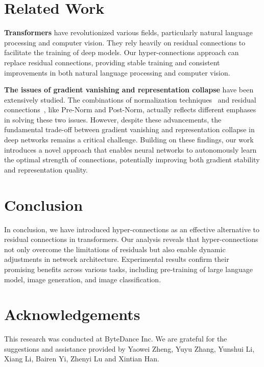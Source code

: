 \documentclass{article} %
\begin{document}
\section{Related Work}

\textbf{Transformers} \citep{vaswani2017attention} have revolutionized various fields, particularly natural language processing and computer vision. They rely heavily on residual connections to facilitate the training of deep models. Our hyper-connections approach can replace residual connections, providing stable training and consistent improvements in both natural language processing and computer vision.

\textbf{The issues of gradient vanishing and representation collapse} \citep{bengio1994learning,glorot2010understanding,liu2020understanding} have been extensively studied. The combinations of normalization techniques~\citep{ioffe2015batch,ba2016layer} and residual connections~\citep{he2016deep}, like Pre-Norm and Post-Norm, actually reflects different emphases in solving these two issues. However, despite these advancements, the fundamental trade-off between gradient vanishing and representation collapse in deep networks remains a critical challenge. Building on these findings, our work introduces a novel approach that enables neural networks to autonomously learn the optimal strength of connections, potentially improving both gradient stability and representation quality.


\section{Conclusion}
In conclusion, we have introduced hyper-connections as an effective alternative to residual connections in transformers. Our analysis reveals that hyper-connections not only overcome the limitations of residuals but also enable dynamic adjustments in network architecture. Experimental results confirm their promising benefits across various tasks, including pre-training of large language model, image generation, and image classification. 



\section*{Acknowledgements}
This research was conducted at ByteDance Inc. We are grateful for the suggestions and assistance provided by Yaowei Zheng, Yuyu Zhang, Yunshui Li, Xiang Li, Bairen Yi, Zhenyi Lu and Xintian Han.


{


}



\end{document}
